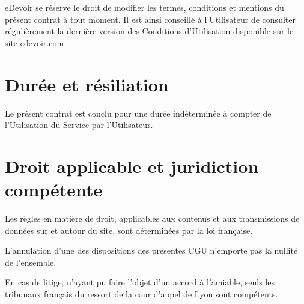 eDevoir se réserve le droit de modifier les termes, conditions et mentions du présent contrat à tout moment.
Il est ainsi conseillé à l'Utilisateur de consulter régulièrement la dernière version des Conditions d'Utilisation disponible sur le site edevoir.com


\section{Durée et résiliation}

Le présent contrat est conclu pour une durée indéterminée à compter de l'Utilisation du Service par l’Utilisateur.


\section{Droit applicable et juridiction compétente}

Les règles en matière de droit, applicables aux contenus et aux transmissions de données sur et autour du site, sont déterminées par la loi française.

L'annulation d'une des dispositions des présentes CGU n'emporte pas la nullité de l'ensemble.

En cas de litige, n'ayant pu faire l'objet d'un accord à l'amiable, seuls les tribunaux français du ressort de la cour d'appel de Lyon sont compétents.
